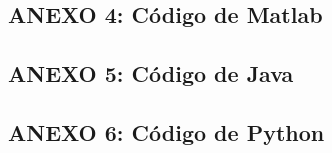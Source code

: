 \documentclass[12pt,a4paper]{article} %
\begin{document}
		\subsection{ANEXO 4: Código de Matlab}
	    	
	    \newpage
	    \subsection{ANEXO 5: Código de Java}
	    	
	    \newpage
	    \subsection{ANEXO 6: Código de Python}
		 	
\end{document}
